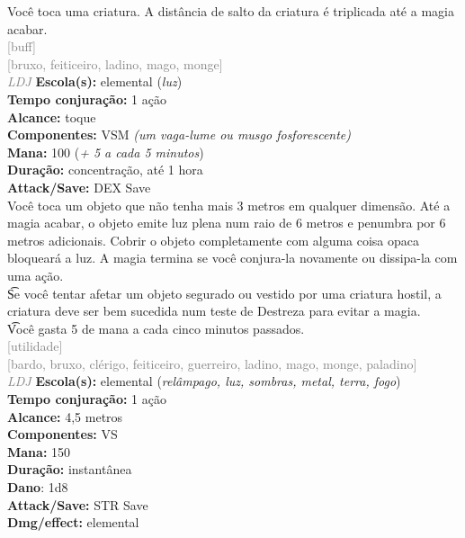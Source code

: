\documentclass{RPG_Adventure}[2021/10/20]
\begin{document}
{\normalsize Você toca uma criatura. A distância de salto da criatura é triplicada até a magia acabar.\\}
{\scriptsize \textcolor{gray}{[buff]\\}}
{\scriptsize \textcolor{gray}{[bruxo, feiticeiro, ladino, mago, monge]\\}}
{\tiny \textcolor{gray}{\textit{LDJ}}}
{\small \t \textbf{Escola(s):} elemental (\textit{luz})\\\t \textbf{Tempo conjuração:} 1 ação\\\t \textbf{Alcance:} toque\\\t \textbf{Componentes:} VSM \textit{(um vaga-lume ou musgo fosforescente)}\\\t \textbf{Mana:} 100 (\textit{+ 5 a cada 5 minutos})\\\t \textbf{Duração:} concentração, até 1 hora\\\t \textbf{Attack/Save:} DEX Save\\}
{\normalsize Você toca um objeto que não tenha mais 3 metros em qualquer dimensão. Até a magia acabar, o objeto emite luz plena num raio de 6 metros e penumbra por 6 metros adicionais. Cobrir o objeto completamente com alguma coisa opaca bloqueará a luz. A magia termina se você conjura-la novamente ou dissipa-la com uma ação.\\\t Se você tentar afetar um objeto segurado ou vestido por uma criatura hostil, a criatura deve ser bem sucedida num teste de Destreza para evitar a magia.\\\t Você gasta 5 de mana a cada cinco minutos passados.\\}
{\scriptsize \textcolor{gray}{[utilidade]\\}}
{\scriptsize \textcolor{gray}{[bardo, bruxo, clérigo, feiticeiro, guerreiro, ladino, mago, monge, paladino]\\}}
{\tiny \textcolor{gray}{\textit{LDJ}}}
{\small \t \textbf{Escola(s):} elemental (\textit{relâmpago, luz, sombras, metal, terra, fogo})\\\t \textbf{Tempo conjuração:} 1 ação\\\t \textbf{Alcance:} 4,5 metros\\\t \textbf{Componentes:} VS\\\t \textbf{Mana:} 150\\\t \textbf{Duração:} instantânea\\\t \textbf{Dano}: 1d8\\\t \textbf{Attack/Save:} STR Save\\\t \textbf{Dmg/effect:} elemental\\}
\end{document}
